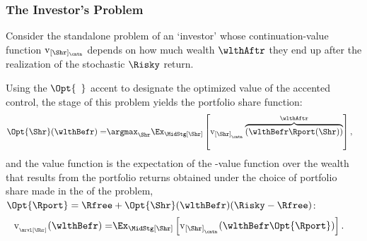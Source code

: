 \documentclass[titlepage, headings=optiontotocandhead]{econtex}
\begin{document}
\hypertarget{subsubsec:investors-problem}{}
\subsubsection{The Investor's Problem}\label{subsubsec:investors-problem}

Consider the standalone problem of an `investor' whose continuation-value function $\mathrm{v}_{[\Shr]_\cntn}$ depends on how much wealth $\wlthAftr$ they end up after the realization of the stochastic $\Risky$ return.

Using the $\Opt{\phantom{\bullet}}$ accent to designate the optimized value of the accented control, the {\Decision} stage of this problem yields the portfolio share function:
  \begin{equation}\begin{gathered}\begin{aligned}
    \Opt{\Shr}(\wlthBefr)  = & \argmax_{\Shr} \Ex_{\MidStg[\Shr]}\left[\mathrm{v}_{[\Shr]_{_\cntn}}\overbrace{\left({\wlthBefr}\Rport(\Shr)\right)}^{\wlthAftr}\right] \label{eq:shrDecision},
         \end{aligned}\end{gathered}\end{equation}
and the {\Arrival} value function is the expectation of the {\Continuation}-value function over the wealth that results from the portfolio returns obtained under the choice of portfolio share made in the {\Decision} {\move} of the problem, $\Opt{\Rport}=\Rfree+\Opt{\Shr}(\wlthBefr)(\Risky-\Rfree)$:
\begin{equation}\begin{gathered}\begin{aligned}
  \mathrm{v}_{_\arvl[\Shr]}(\wlthBefr)  = & \Ex_{\MidStg[\Shr]}\left[ \mathrm{v}_{[\Shr]_{_\cntn}}(\wlthBefr \Opt{\Rport} )\right] \label{eq:vMidStgShr}.
    \end{aligned}\end{gathered}\end{equation}

\end{document}
